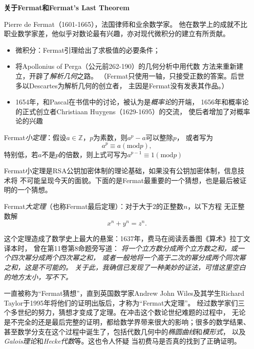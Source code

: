 \begin{shaded}
	{\bf 关于Fermat和Fermat's Last Theorem}
	
	Pierre de Fermat（1601-1665），法国律师和业余数学家。
	他在数学上的成就不比职业数学家差，他似乎对数论最有兴趣，亦对现代微积分的建立有所贡献。
	\begin{itemize}
	  \item 微积分：Fermat引理给出了求极值的必要条件；
	  \item 将Apollonius of Perga（公元前262-190）的几何分析中用代数
	  方法来重新建立，开辟了{\it 解析几何}之路。
	  （Fermat只使用一轴，只接受正数的答案。后世多以Descartes为解析几何的创立者，
	  主因是Fermat没有发表其作品。）
	  \item 1654年，和Pascal在书信中的讨论，被认为是{\it 概率论}的开端，
	  1656年和概率论的正式创立者Christiaan Huygens（1629-1695）的交流，
	  使后者增加了对概率论的兴趣
	\end{itemize}
	
	\begin{tcolorbox}
		Fermat{\it 小定理}：假设$a\in\mathbb{Z}$，$p$为素数，则$a^p-a$可以整除$p$，
		或者写为
		$$a^p\equiv a(\mathrm{mod}p),$$
		特别低，若$a$不是$p$的倍数，则上式可写为$a^{p-1}\equiv 1(\mathrm{mod} p)$
	\end{tcolorbox}
	
	Fermat小定理是RSA公钥加密体制的理论基础，如果没有公钥加密体制，信息技术将
	不可能呈现今天的面貌。下面的是Fermat最重要的一个猜想，也是最后被证明的一个猜想。
	
	\begin{tcolorbox}
		Fermat{\it 大定理}（也称Fermat最后定理）：对于大于$2$的正整数$n$，以下方程
		无正整数解
		$$x^n+y^n=z^n.$$
	\end{tcolorbox}
	
	这个定理造成了数学史上最大的悬案：1637年，费马在阅读丢番图《算术》拉丁文译本时，
	曾在第11卷第8命题旁写道：
	{\it 将一个立方数分成两个立方数之和，或一个四次幂分成两个四次幂之和，
	或者一般地将一个高于二次的幂分成两个同次幂之和，这是不可能的。
	关于此，我确信已发现了一种美妙的证法，可惜这里空白的地方太小，写不下。}
	
	一直被称为“Fermat猜想”，直到英国数学家Andrew John Wiles及其学生Richard
	Taylor于1995年将他们的证明出版后，才称为“Fermat大定理”。
	经过数学家们三个多世纪的努力，猜想才变成了定理。在冲击这个数论世纪难题的过程中，
	无论是不完全的还是最后完整的证明，都给数学界带来很大的影响；很多的数学结果、
	甚至数学分支在这个过程中诞生了，包括代数几何中的{\it 椭圆曲线}和{\it 模形式}，
	以及{\it	Galois理论}和{\it Hecke代数}等。这也令人怀疑
	当初费马是否真的找到了正确证明。
	

\end{shaded}
